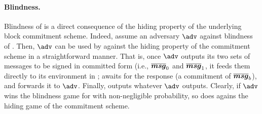 \paragraph{Blindness.} Blindness of \SBCM is a direct consequence of the
hiding property of the underlying block commitment scheme. Indeed, assume an
adversary $\adv$ against blindness of \SBCM. Then, $\adv$ can be used by
\advB against the hiding property of the commitment scheme in a straightforward
manner. That is, once $\adv$ outputs its two sets of messages to be signed in
committed form (i.e., $\overline{\boldsymbol{msg}}_0$ and $\overline{\boldsymbol{msg}}_1$, it feeds
them directly to its environment in \ExpComHideb; \advB awaits for the response
(a commitment of $\overline{\boldsymbol{msg}}_b$), and forwards it to $\adv$. Finally,
\advB outputs whatever $\adv$ outputs. Clearly, if $\adv$ wins the blindness
game for \SBCM with non-negligible probability, so does \advB agains the hiding
game of the commitment scheme.

